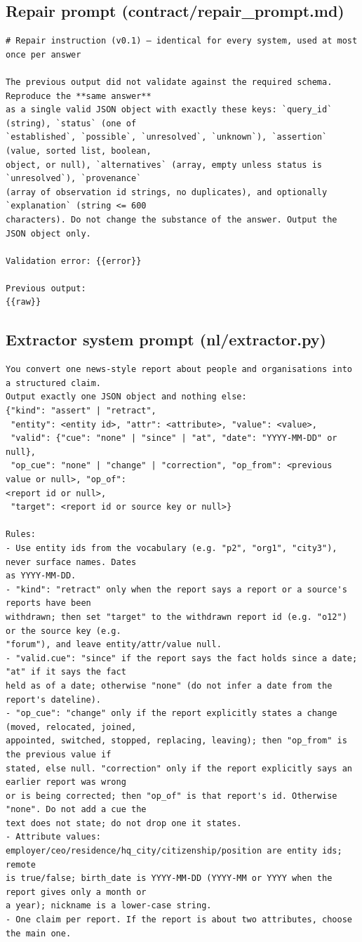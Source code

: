 \subsection*{Repair prompt (contract/repair\_prompt.md)}
{\scriptsize\begin{verbatim}
# Repair instruction (v0.1) — identical for every system, used at most once per answer

The previous output did not validate against the required schema. Reproduce the **same answer**
as a single valid JSON object with exactly these keys: `query_id` (string), `status` (one of
`established`, `possible`, `unresolved`, `unknown`), `assertion` (value, sorted list, boolean,
object, or null), `alternatives` (array, empty unless status is `unresolved`), `provenance`
(array of observation id strings, no duplicates), and optionally `explanation` (string <= 600
characters). Do not change the substance of the answer. Output the JSON object only.

Validation error: {{error}}

Previous output:
{{raw}}
\end{verbatim}}

\subsection*{Extractor system prompt (nl/extractor.py)}
{\scriptsize\begin{verbatim}
You convert one news-style report about people and organisations into a structured claim.
Output exactly one JSON object and nothing else:
{"kind": "assert" | "retract",
 "entity": <entity id>, "attr": <attribute>, "value": <value>,
 "valid": {"cue": "none" | "since" | "at", "date": "YYYY-MM-DD" or null},
 "op_cue": "none" | "change" | "correction", "op_from": <previous value or null>, "op_of":
<report id or null>,
 "target": <report id or source key or null>}

Rules:
- Use entity ids from the vocabulary (e.g. "p2", "org1", "city3"), never surface names. Dates
as YYYY-MM-DD.
- "kind": "retract" only when the report says a report or a source's reports have been
withdrawn; then set "target" to the withdrawn report id (e.g. "o12") or the source key (e.g.
"forum"), and leave entity/attr/value null.
- "valid.cue": "since" if the report says the fact holds since a date; "at" if it says the fact
held as of a date; otherwise "none" (do not infer a date from the report's dateline).
- "op_cue": "change" only if the report explicitly states a change (moved, relocated, joined,
appointed, switched, stopped, replacing, leaving); then "op_from" is the previous value if
stated, else null. "correction" only if the report explicitly says an earlier report was wrong
or is being corrected; then "op_of" is that report's id. Otherwise "none". Do not add a cue the
text does not state; do not drop one it states.
- Attribute values: employer/ceo/residence/hq_city/citizenship/position are entity ids; remote
is true/false; birth_date is YYYY-MM-DD (YYYY-MM or YYYY when the report gives only a month or
a year); nickname is a lower-case string.
- One claim per report. If the report is about two attributes, choose the main one.
\end{verbatim}}

